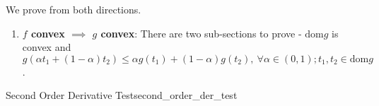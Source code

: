 \begin{proof*}
	We prove from both directions.
	\begin{enumerate}[label=(\roman*)]
		\item \textbf{$f$ convex $\implies$ $g$ convex}: There are two sub-sections to prove - $\mathrm{dom}g$ is convex and $g(\alpha t_1 + (1-\alpha)t_2)\le \alpha g(t_1) + (1-\alpha)g(t_2), \ \forall \alpha\in(0,1); t_1, t_2\in \mathrm{dom}g$.	
	\end{enumerate} 	
\end{proof*} 

\begin{proposition}{Second Order Derivative Test}{second_order_der_test}
	
\end{proposition} 

